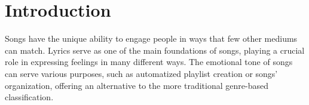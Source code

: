 \chapter*{Introduction}
\label{ch:Introduction}




Songs have the unique ability to engage people in ways that few other mediums can match. 
Lyrics serve as one of the main foundations of songs, playing a crucial role in
expressing feelings in many different ways.
The emotional tone of songs can serve various purposes, such as
automatized playlist creation or songs' organization,
offering an alternative to the more traditional genre-based classification. \\

